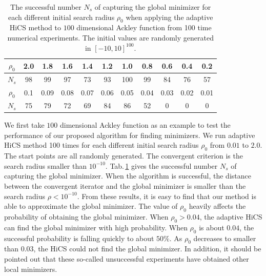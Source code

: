 \documentclass[final,1p,times]{elsarticle}
\begin{document}
\begin{table}[!hbpt]
\caption{
The successful number $N_s$ of capturing the global minimizer for
each different initial search radius $\rho_0$ when applying the
adaptive HiCS method to $100$ dimensional Ackley function from 100
time numerical experiments. 
The initial values are randomly generated in $[-10,10]^{100}$.
}
\label{tab:ackley100D:AHiCS}
\begin{center}
\begin{tabular}{|c|c|c|c|c|c|c|c|c|c|c|}
 \hline
  $\rho_0$  & 2.0 & 1.8 & 1.6 & 1.4 & 1.2 & 1.0 & 0.8 & 0.6 & 0.4 & 0.2 
 \\\hline
  $N_s$     & 98  & 99  & 97  & 73  & 93  & 100 & 99  & 84  & 76 & 57 
\\\hline \hline
 $\rho_0$ & 0.1 & 0.09 & 0.08 & 0.07 & 0.06 & 0.05 & 0.04 & 0.03& 0.02 & 0.01
 \\\hline
  $N_s$& 75 & 79 & 72 & 69 & 84 &86 & 52 & 0 & 0 & 0
\\ \hline
\end{tabular}
\end{center}
\end{table}
We first take $100$ dimensional Ackley function as an example to
test the performance of our proposed algorithm for finding minimizers. 
We run adaptive HiCS method 100 times for each different initial
search radius $\rho_0$ from $0.01$ to $2.0$.
The start points are all randomly generated.
The convergent criterion is the search radius smaller than $10^{-10}$.
Tab.\,\ref{tab:ackley100D:AHiCS} gives the successful number
$N_s$ of capturing the global minimizer.  
When the algorithm is successful, the distance between the
convergent iterator and the global minimizer is smaller than the
search radius $\rho < 10^{-10}$.
From these results, it is easy to find that our method is able to
approximate the global minimizer. 
The value of $\rho_0$ heavily affects the probability of
obtaining the global minimizer. 
When $\rho_0 > 0.04$, the adaptive HiCS can find the global
minimizer with high probability. 
When $\rho_0$ is about $0.04$, 
the successful probability is falling quickly to about $50\%$. 
As $\rho_0$ decreases to smaller than $0.03$, the HiCS could not
find the global minimizer.
In addition, it should be pointed out that these so-called unsuccessful
experiments have obtained other local minimizers. 
\end{document}
